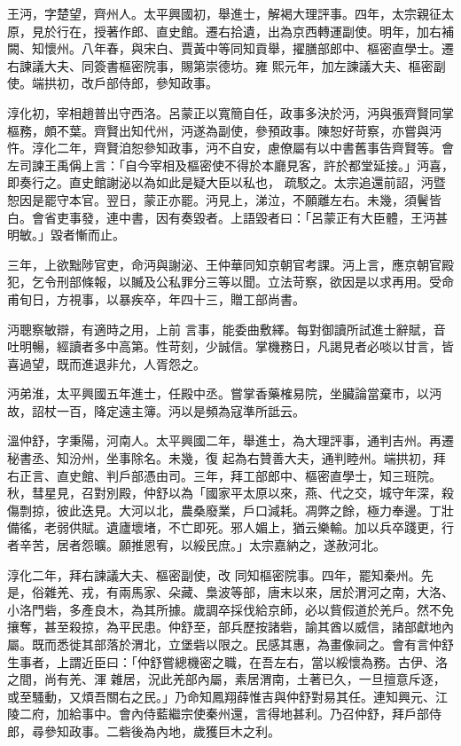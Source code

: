 \begin{pinyinscope}
 王沔，字楚望，齊州人。太平興國初，舉進士，解褐大理評事。四年，太宗親征太原，見於行在，授著作郎、直史館。遷右拾遺，出為京西轉運副使。明年，加右補闕、知懷州。八年春，與宋白、賈黃中等同知貢舉，擢膳部郎中、樞密直學士。遷右諫議大夫、同簽書樞密院事，賜第崇德坊。雍
 熙元年，加左諫議大夫、樞密副使。端拱初，改戶部侍郎，參知政事。



 淳化初，宰相趙普出守西洛。呂蒙正以寬簡自任，政事多決於沔，沔與張齊賢同掌樞務，頗不葉。齊賢出知代州，沔遂為副使，參預政事。陳恕好苛察，亦嘗與沔忤。淳化二年，齊賢洎恕參知政事，沔不自安，慮僚屬有以中書舊事告齊賢等。會左司諫王禹偁上言：「自今宰相及樞密使不得於本廳見客，許於都堂延接。」沔喜，即奏行之。直史館謝泌以為如此是疑大臣以私也，
 疏駁之。太宗追還前詔，沔暨恕因是罷守本官。翌日，蒙正亦罷。沔見上，涕泣，不願離左右。未幾，須鬢皆白。會省吏事發，連中書，因有奏毀者。上語毀者曰：「呂蒙正有大臣體，王沔甚明敏。」毀者慚而止。



 三年，上欲黜陟官吏，命沔與謝泌、王仲華同知京朝官考課。沔上言，應京朝官殿犯，乞令刑部條報，以贓及公私罪分三等以聞。立法苛察，欲因是以求再用。受命甫旬日，方視事，以暴疾卒，年四十三，贈工部尚書。



 沔聰察敏辯，有適時之用，上前
 言事，能委曲敷繹。每對御讀所試進士辭賦，音吐明暢，經讀者多中高第。性苛刻，少誠信。掌機務日，凡謁見者必啖以甘言，皆喜過望，既而進退非允，人胥怨之。



 沔弟淮，太平興國五年進士，任殿中丞。嘗掌香藥榷易院，坐臟論當棄市，以沔故，詔杖一百，降定遠主簿。沔以是頻為寇準所詆云。



 溫仲舒，字秉陽，河南人。太平興國二年，舉進士，為大理評事，通判吉州。再遷秘書丞、知汾州，坐事除名。未幾，復
 起為右贊善大夫，通判睦州。端拱初，拜右正言、直史館、判戶部憑由司。三年，拜工部郎中、樞密直學士，知三班院。秋，彗星見，召對別殿，仲舒以為「國家平太原以來，燕、代之交，城守年深，殺傷剽掠，彼此迭見。大河以北，農桑廢業，戶口減耗。凋弊之餘，極力奉邊。丁壯備徭，老弱供賦。遺廬壞堵，不亡即死。邪人媚上，猶云樂輸。加以兵卒踐更，行者辛苦，居者怨曠。願推恩宥，以綏民庶。」太宗嘉納之，遂赦河北。



 淳化二年，拜右諫議大夫、樞密副使，改
 同知樞密院事。四年，罷知秦州。先是，俗雜羌、戎，有兩馬家、朵藏、梟波等部，唐末以來，居於渭河之南，大洛、小洛門砦，多產良木，為其所據。歲調卒採伐給京師，必以貲假道於羌戶。然不免攘奪，甚至殺掠，為平民患。仲舒至，部兵歷按諸砦，諭其酋以威信，諸部獻地內屬。既而悉徙其部落於渭北，立堡砦以限之。民感其惠，為畫像祠之。會有言仲舒生事者，上謂近臣曰：「仲舒嘗總機密之職，在吾左右，當以綏懷為務。古伊、洛之間，尚有羌、渾
 雜居，況此羌部內屬，素居渭南，土著已久，一旦擅意斥逐，或至騷動，又煩吾關右之民。」乃命知鳳翔薛惟吉與仲舒對易其任。連知興元、江陵二府，加給事中。會內侍藍繼宗使秦州還，言得地甚利。乃召仲舒，拜戶部侍郎，尋參知政事。二砦後為內地，歲獲巨木之利。




\end{pinyinscope}
